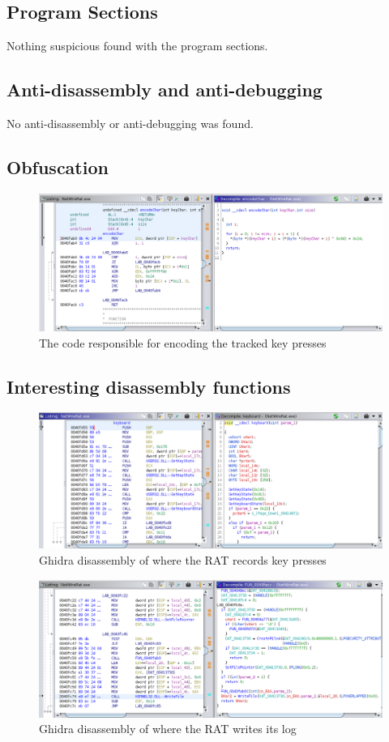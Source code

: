 \documentclass{article}
\begin{document}
    \subsection{Program Sections}
    Nothing suspicious found with the program sections.
    \subsection{Anti-disassembly and anti-debugging}
    No anti-disassembly or anti-debugging was found.
    \subsection{Obfuscation}
    \begin{figure}[H]
        \includegraphics[width=\textwidth]{ghidra-encode.png}
        \caption{The code responsible for encoding the tracked key presses}
        \label{fig:encode}
    \end{figure}
    \subsection{Interesting disassembly functions}
    \begin{figure}[H]
        \includegraphics[width=\textwidth]{keyboard-function.png}
        \caption{Ghidra disassembly of where the RAT records key presses}
    \end{figure}
    \begin{figure}[H]
        \includegraphics[width=\textwidth]{ghidra-writeFile.png}
        \caption{Ghidra disassembly of where the RAT writes its log}
    \end{figure}
    \pagebreak
\end{document}
